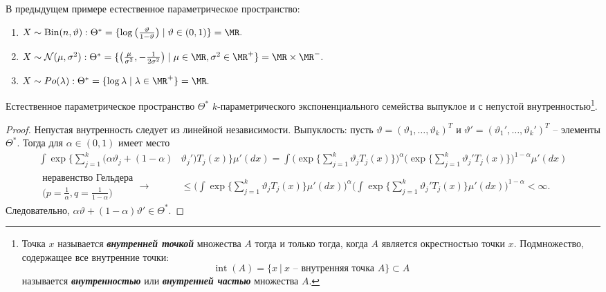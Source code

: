 \begin{exmp}
	В предыдущем примере естественное параметрическое пространство:
	\begin{enumerate}
		\item $X \sim \operatorname{Bin}(n, \vartheta): \Theta^* = \{\log\big(\frac{\vartheta}{1-\vartheta}\big) \mid \vartheta \in (0, 1) \} = \MR.$
		\item $X \sim \mathcal{N}(\mu, \sigma^2): \Theta^* = \{\big(\frac{\mu}{\sigma^2}, -\frac{1}{2\sigma^2}\big) \mid \mu \in \MR, \sigma^2 \in \MR^+ \} = \MR \times \MR^-.$
		\item $X \sim Po(\lambda): \Theta^* = \{\log \lambda \mid \lambda \in \MR^+ \} = \MR.$
	\end{enumerate}
\end{exmp}

\begin{thm}
	Естественное параметрическое пространство $\Theta^*$ $k$-параметрического экспоненциального семейства выпуклое и с непустой внутренностью\footnote{
			 Точка $x$ называется \textbf{\textit{внутренней точкой}} множества $A$ тогда и только тогда, когда $A$ является окрестностью точки $x$. Подмножество, содержащее все внутренние точки:
			 \[\operatorname{int}(A) = \{ x\ |\ x \text{ -- внутренняя точка } A\} \subset A \]
			называется \textbf{\textit{внутренностью}} или \textbf{\textit{внутренней частью}} множества $A$.
		}.
\end{thm}
\begin{proof}
	Непустая внутренность следует из линейной независимости. Выпуклость: пусть $\vartheta = (\vartheta_1, \dots, \vartheta_k)^T$ и $\vartheta' = (\vartheta_1', \dots, \vartheta_k')^T$ -- элементы $\Theta^*$. Тогда для $\alpha \in (0, 1)$ имеет место
	\[ \begin{aligned}
	  \int \exp \Big \{ \sum_{j = 1}^{k} (\alpha \vartheta_j + (1-\alpha) & \vartheta_j') T_j(x) \Big\}\mu'(dx) = \int \Big(\exp \Big \{\sum_{j = 1}^{k} \vartheta_j T_j(x) \Big\}\Big)^\alpha \Big(\exp \Big \{\sum_{j = 1}^{k} \vartheta_j' T_j(x) \Big\}\Big)^{1-\alpha} \mu'(dx) \\
	  \begin{aligned}\text{неравенство Гельдера} \\ \Big(p = \frac{1}{\alpha}, q = \frac{1}{1 - \alpha}\Big) \end{aligned}\longrightarrow & \leq  \Bigg(\int \exp \Big \{\sum_{j = 1}^{k} \vartheta_j T_j(x) \Big\}\mu'(dx)\Bigg)^\alpha \Bigg(\int\exp \Big \{\sum_{j = 1}^{k} \vartheta_j' T_j(x) \Big\}\mu'(dx) \Bigg)^{1-\alpha} < \infty.
	\end{aligned} \]
	Следовательно, $\alpha \vartheta + (1-\alpha)\vartheta' \in \Theta^*$.
\end{proof}

